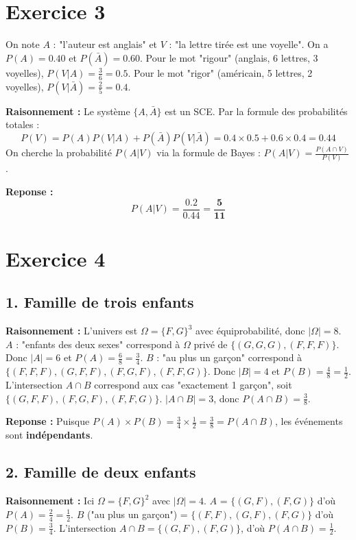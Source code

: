 \documentclass[11pt,a4paper]{article}
\begin{document}
\hrulefill

\section*{Exercice 3}

On note $A$ : "l'auteur est anglais" et $V$ : "la lettre tirée est une voyelle".
On a $P(A) = 0.40$ et $P(\bar{A}) = 0.60$.
Pour le mot "rigour" (anglais, 6 lettres, 3 voyelles), $P(V|A) = \frac{3}{6} = 0.5$.
Pour le mot "rigor" (américain, 5 lettres, 2 voyelles), $P(V|\bar{A}) = \frac{2}{5} = 0.4$.

\textbf{Raisonnement :} Le système $\{A, \bar{A}\}$ est un SCE. Par la formule des probabilités totales :
$$P(V) = P(A)P(V|A) + P(\bar{A})P(V|\bar{A}) = 0.4 \times 0.5 + 0.6 \times 0.4 = 0.44$$
On cherche la probabilité $P(A|V)$ via la formule de Bayes : $P(A|V) = \frac{P(A \cap V)}{P(V)}$.

\textbf{Reponse :} 
$$P(A|V) = \frac{0.2}{0.44} = \mathbf{\frac{5}{11}}$$

\hrulefill

\section*{Exercice 4}

\subsection*{1. Famille de trois enfants}

\textbf{Raisonnement :} L'univers est $\Omega = \{F, G\}^3$ avec équiprobabilité, donc $|\Omega| = 8$.
$A$ : "enfants des deux sexes" correspond à $\Omega$ privé de $\{(G,G,G), (F,F,F)\}$. Donc $|A| = 6$ et $P(A) = \frac{6}{8} = \frac{3}{4}$.
$B$ : "au plus un garçon" correspond à $\{(F,F,F), (G,F,F), (F,G,F), (F,F,G)\}$. Donc $|B| = 4$ et $P(B) = \frac{4}{8} = \frac{1}{2}$.
L'intersection $A \cap B$ correspond aux cas "exactement 1 garçon", soit $\{(G,F,F), (F,G,F), (F,F,G)\}$. $|A \cap B| = 3$, donc $P(A \cap B) = \frac{3}{8}$.

\textbf{Reponse :} Puisque $P(A) \times P(B) = \frac{3}{4} \times \frac{1}{2} = \frac{3}{8} = P(A \cap B)$, les événements sont \textbf{indépendants}.

\subsection*{2. Famille de deux enfants}

\textbf{Raisonnement :} Ici $\Omega = \{F, G\}^2$ avec $|\Omega| = 4$.
$A$ = $\{(G,F), (F,G)\}$ d'où $P(A) = \frac{2}{4} = \frac{1}{2}$.
$B$ ("au plus un garçon") = $\{(F,F), (G,F), (F,G)\}$ d'où $P(B) = \frac{3}{4}$.
L'intersection $A \cap B = \{(G,F), (F,G)\}$, d'où $P(A \cap B) = \frac{1}{2}$.
\end{document}
